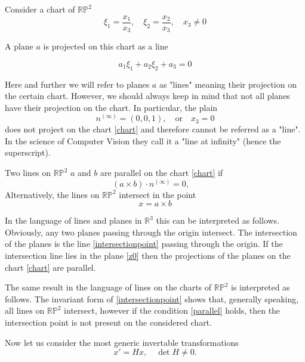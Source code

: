 \documentclass[a4paper,10pt]{article}
\begin{document}
 Consider a chart of $\mathbb{RP}^2$
 \begin{equation}
 \xi_1 = \frac{x_1}{x_3}, \quad \xi_2=\frac{x_2}{x_3}, \quad x_3\neq 0\label{chart}
 \end{equation}
 
A plane $a$ is projected on this chart as a line

\begin{equation}
a_1 \xi_1 + a_2 \xi_2 + a_3 = 0
\end{equation} 

Here and further we will refer to planes $a$ as "lines" meaning their projection on the certain chart. However, we should always keep in mind that not all planes have their projection on the chart. In particular, the plain 
\begin{equation}
n^{(\infty)} = (0,0,1), \quad \text{or} \quad x_3 = 0\label{z0}
\end{equation}
does not project on the chart \eqref{chart} and therefore cannot be referred as a "line". In the science of Computer Vision they call it a "line at infinity" (hence the superscript).

Two lines on $\mathbb{RP}^2$ $a$ and $b$ are parallel on the chart  \eqref{chart} if 
\begin{equation}
(a\times b )\cdot n^{(\infty)} = 0, \quad \label{parallel}
\end{equation}
Alternatively, the lines on $\mathbb{RP}^2$ intersect in the point 
\begin{equation}
x = a \times b\label{intersectionpoint}
\end{equation}

In the language of lines and planes in $\mathbb{R}^3$ this can be interpreted as follows. Obviously, any two planes passing through the origin intersect. The intersection of the planes is the line \eqref{intersectionpoint} passing through the origin. If the intersection line lies in the plane \eqref{z0} then the projections of the planes on the chart \eqref{chart} are parallel.

The same result in the language of lines on the charts of $\mathbb{RP}^2$ is interpreted as  follows. The invariant form of \eqref{intersectionpoint} shows that, generally speaking, all lines on $\mathbb{RP}^2$ intersect, however if the condition \eqref{parallel} holds, then the intersection point is not  present on the considered chart.

Now let us consider the most generic invertable transformations 
\begin{equation}
x' = H x, \quad \det H \neq 0. 
\end{equation}
\end{document}
